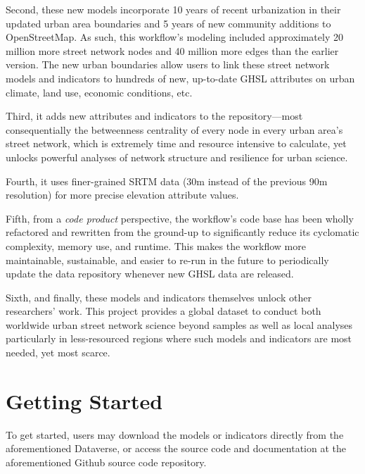 \documentclass[12pt,letterpaper]{article} %
\begin{document}
Second, these new models incorporate 10 years of recent urbanization in their updated urban area boundaries and 5 years of new community additions to OpenStreetMap. As such, this workflow's modeling included approximately 20 million more street network nodes and 40 million more edges than the earlier version. The new urban boundaries allow users to link these street network models and indicators to hundreds of new, up-to-date GHSL attributes on urban climate, land use, economic conditions, etc.

Third, it adds new attributes and indicators to the repository---most consequentially the betweenness centrality of every node in every urban area's street network, which is extremely time and resource intensive to calculate, yet unlocks powerful analyses of network structure and resilience for urban science.

Fourth, it uses finer-grained SRTM data (30m instead of the previous 90m resolution) for more precise elevation attribute values.

Fifth, from a \textit{code product} perspective, the workflow's code base has been wholly refactored and rewritten from the ground-up to significantly reduce its cyclomatic complexity, memory use, and runtime. This makes the workflow more maintainable, sustainable, and easier to re-run in the future to periodically update the data repository whenever new GHSL data are released.

Sixth, and finally, these models and indicators themselves unlock other researchers' work. This project provides a global dataset to conduct both worldwide urban street network science beyond samples as well as local analyses particularly in less-resourced regions where such models and indicators are most needed, yet most scarce.

\section{Getting Started}

To get started, users may download the models or indicators directly from the aforementioned Dataverse, or access the source code and documentation at the aforementioned Github source code repository.


\setlength{\bibsep}{0.00cm plus 0.05cm} %


\end{document}
